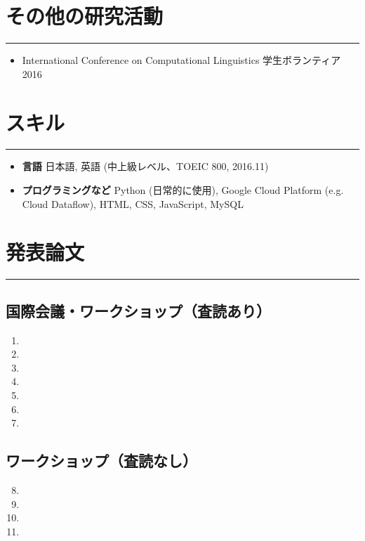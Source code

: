 \documentclass[a4paper,11pt]{ltjsarticle}
\newcommand{\sectrule}{
    \vspace*{-1.1\baselineskip}
    \noindent\rule{\linewidth}{3pt}}
\newcommand{\NewPart}[1]{\section*{\uppercase{#1}}\sectrule}
\begin{document}
\NewPart{その他の研究活動}{}
\begin{itemize}[leftmargin=2em,topsep=0.5em,itemsep=0em]
    \item International Conference on Computational Linguistics 学生ボランティア \hfill 2016
\end{itemize}

\NewPart{スキル}{}
\begin{itemize}[leftmargin=2em,topsep=0.5em,itemsep=0em]
    \item \textbf{言語}\hspace{1em} 日本語, 英語 (中上級レベル、TOEIC 800, 2016.11)
    \item \textbf{プログラミングなど}\hspace{1em} Python (日常的に使用), Google Cloud Platform (e.g. Cloud Dataflow), HTML, CSS, JavaScript, MySQL
\end{itemize}

\newpage

\NewPart{発表論文}{}
\vspace*{-\baselineskip}
\subsection*{国際会議・ワークショップ（査読あり）}
\begin{enumerate}[leftmargin=2em,topsep=0.5em,itemsep=0em]
    \item {}
    \item {}
    \item {}
    \item {}
    \item {}
    \item {}
    \item {}
\end{enumerate}

\subsection*{ワークショップ（査読なし）}
\begin{enumerate}[leftmargin=2em,topsep=0.5em,itemsep=0em]
    \setcounter{enumi}{7}
    \item {}
    \item {}
    \item {}
    \item {}
\end{enumerate}
\end{document}
